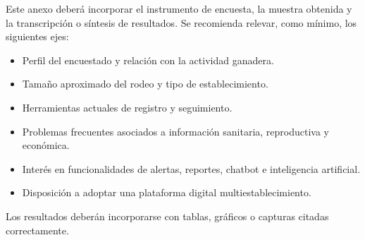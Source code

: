 
Este anexo deber\'a incorporar el instrumento de encuesta, la muestra obtenida y la transcripci\'on o s\'intesis de resultados. Se recomienda relevar, como m\'inimo, los siguientes ejes:

\begin{itemize}
    \item Perfil del encuestado y relaci\'on con la actividad ganadera.
    \item Tama\~no aproximado del rodeo y tipo de establecimiento.
    \item Herramientas actuales de registro y seguimiento.
    \item Problemas frecuentes asociados a informaci\'on sanitaria, reproductiva y econ\'omica.
    \item Inter\'es en funcionalidades de alertas, reportes, chatbot e inteligencia artificial.
    \item Disposici\'on a adoptar una plataforma digital multiestablecimiento.
\end{itemize}

Los resultados deber\'an incorporarse con tablas, gr\'aficos o capturas citadas correctamente.

